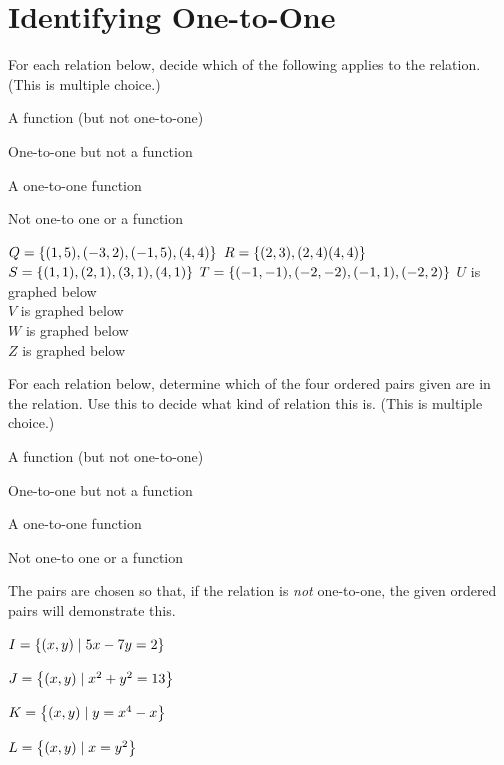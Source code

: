 \clearpage
\section*{Identifying One-to-One}
For each relation below, decide which of the following applies to the relation. (This is multiple choice.)
\begin{clist}
\item A function (but not one-to-one)
\item One-to-one but not a function
\item A one-to-one function
\item Not one-to one or a function
\end{clist}
\begin{smenum}
\mitemxx
{$Q=\left\{(1,5),(-3,2),(-1,5),(4,4)\right\}$}
{$R=\left\{(2,3),(2,4)(4,4)\right\}$}
\mitemxx
{$S=\left\{(1,1),(2,1),(3,1),(4,1)\right\}$}
{$T=\left\{(-1,-1),(-2,-2),(-1,1),(-2,2)\right\}$}
\mitemxxxx
{$U$ is graphed below\\}
{$V$ is graphed below\\}
{$W$ is graphed below\\}
{$Z$ is graphed below\\}
\end{smenum}
For each relation below, determine which of the four ordered pairs given are in the relation. Use this to decide what kind of relation this is. (This is multiple choice.)
\begin{clist}
\item A function (but not one-to-one)
\item One-to-one but not a function
\item A one-to-one function
\item Not one-to one or a function
\end{clist}
The pairs are chosen so that, if the relation is \emph{not} one-to-one, the given ordered pairs will demonstrate this.
\TabPositions{2in,2.75in,3.5in,4.25in}
\begin{senum}
\item $I=\left\{(x,y)\mid5x-7y=2\right\}$
\item $J=\left\{(x,y)\mid x^2+y^2=13\right\}$
\item $K=\left\{(x,y)\mid y=x^4-x\right\}$
\item $L=\left\{(x,y)\mid x=y^2\right\}$
\end{senum}

